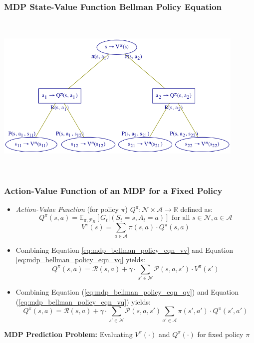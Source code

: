 \documentclass[handout]{beamer}
\begin{document}
\begin{frame}
\frametitle{MDP State-Value Function Bellman Policy Equation}
\includegraphics[width=12cm, height=8cm]{mdp_bellman_policy_tree_vv.png}
\end{frame}

\begin{frame}
\frametitle{Action-Value Function of an MDP for a Fixed Policy}
\pause
\begin{itemize}[<+->]
\item {\em Action-Value Function} (for policy $\pi$) $Q^{\pi}: \mathcal{N} \times \mathcal{A} \rightarrow \mathbb{R}$ defined as:
$$Q^{\pi}(s, a) = \mathbb{E}_{\pi, \mathcal{P}_R}[G_t|(S_t=s, A_t=a)] \text{ for all } s \in \mathcal{N}, a\in \mathcal{A}$$
\begin{equation}
V^{\pi}(s) = \sum_{a\in\mathcal{A}} \pi(s, a) \cdot Q^{\pi}(s, a)
\label{eq:mdp_bellman_policy_eqn_vq}
\end{equation}
\item Combining Equation \eqref{eq:mdp_bellman_policy_eqn_vv} and Equation \eqref{eq:mdp_bellman_policy_eqn_vq} yields:
\begin{equation}
Q^{\pi}(s, a) = \mathcal{R}(s,a) + \gamma \cdot \sum_{s'\in \mathcal{N}} \mathcal{P}(s,a,s') \cdot V^{\pi}(s')
\label{eq:mdp_bellman_policy_eqn_qv}
\end{equation}
\item Combining Equation (\ref{eq:mdp_bellman_policy_eqn_qv}) and Equation (\ref{eq:mdp_bellman_policy_eqn_vq}) yields:
\begin{equation}
Q^{\pi}(s, a) = \mathcal{R}(s,a) + \gamma \cdot \sum_{s'\in \mathcal{N}} \mathcal{P}(s,a,s') \sum_{a'\in \mathcal{A}} \pi(s', a') \cdot Q^{\pi}(s', a')
\label{eq:mdp_bellman_policy_eqn_qq}
\end{equation}
\end{itemize}
{\bf MDP Prediction Problem:} Evaluating $V^{\pi}(\cdot)$ and $Q^{\pi}(\cdot)$ for fixed policy $\pi$
\end{frame}
\end{document}
